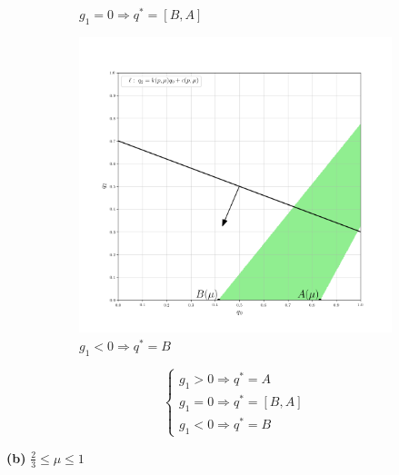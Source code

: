 \begin{flushleft}
\begin{figure}[H]
\begin{subfigure}[b]{0.3 \textwidth}
        	\caption{$g_1 = 0 \Rightarrow q^*=[B,A]$}
        	\label{fig:three sin x}
     	\end{subfigure}
     	\begin{subfigure}[b]{0.3 \textwidth}
        	\centering
        	\includegraphics[width=\textwidth]{images/graf_3_9_1}
        	\caption{$g_1 < 0 \Rightarrow q^*=B$}
        	\label{fig:three sin x}
     	\end{subfigure}
     	\caption{}
     	\label{fig:3_mu_0}
	\end{figure}

	
	$$
		\begin{cases}
			g_1 > 0 \Rightarrow q^*=A \\
			g_1 = 0 \Rightarrow q^*=[B,A] \\
			g_1 < 0 \Rightarrow q^*=B
		\end{cases}
	$$	
	
	\textbf{(b)} $\frac{2}{3} \leqslant \mu \leqslant 1$
			

\end{flushleft}

